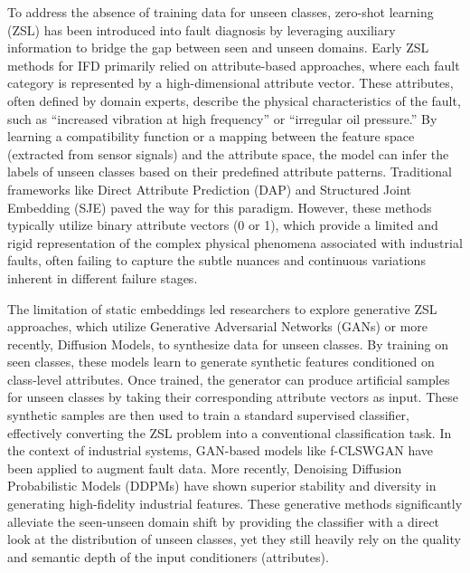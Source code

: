 \documentclass[journal]{IEEEtran}
\begin{document}
To address the absence of training data for unseen classes, zero-shot learning (ZSL) has been introduced into fault diagnosis by leveraging auxiliary information to bridge the gap between seen and unseen domains. Early ZSL methods for IFD primarily relied on attribute-based approaches, where each fault category is represented by a high-dimensional attribute vector. These attributes, often defined by domain experts, describe the physical characteristics of the fault, such as ``increased vibration at high frequency'' or ``irregular oil pressure.'' By learning a compatibility function or a mapping between the feature space (extracted from sensor signals) and the attribute space, the model can infer the labels of unseen classes based on their predefined attribute patterns. Traditional frameworks like Direct Attribute Prediction (DAP) and Structured Joint Embedding (SJE) paved the way for this paradigm. However, these methods typically utilize binary attribute vectors (0 or 1), which provide a limited and rigid representation of the complex physical phenomena associated with industrial faults, often failing to capture the subtle nuances and continuous variations inherent in different failure stages.

The limitation of static embeddings led researchers to explore generative ZSL approaches, which utilize Generative Adversarial Networks (GANs) or more recently, Diffusion Models, to synthesize data for unseen classes. By training on seen classes, these models learn to generate synthetic features conditioned on class-level attributes. Once trained, the generator can produce artificial samples for unseen classes by taking their corresponding attribute vectors as input. These synthetic samples are then used to train a standard supervised classifier, effectively converting the ZSL problem into a conventional classification task. In the context of industrial systems, GAN-based models like f-CLSWGAN have been applied to augment fault data. More recently, Denoising Diffusion Probabilistic Models (DDPMs) have shown superior stability and diversity in generating high-fidelity industrial features. These generative methods significantly alleviate the seen-unseen domain shift by providing the classifier with a direct look at the distribution of unseen classes, yet they still heavily rely on the quality and semantic depth of the input conditioners (attributes).
\end{document}
